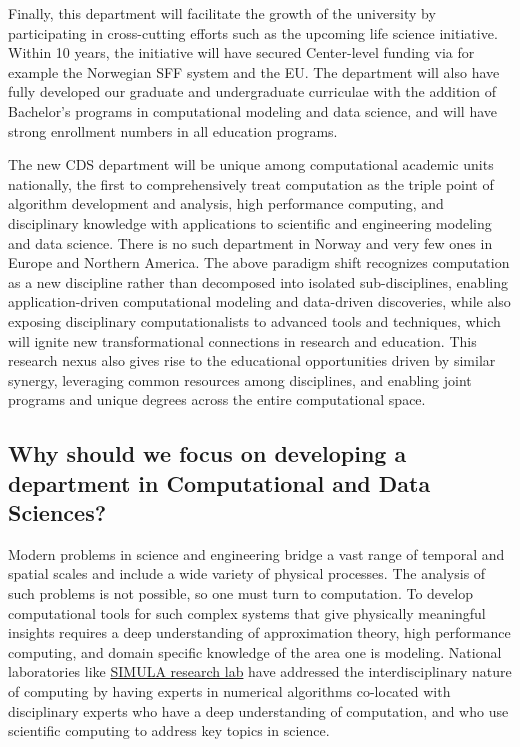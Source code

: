 \documentclass[%
oneside,                 %
final,                   %
10pt]{article}
\begin{document}
\noindent
Finally, this department will facilitate the growth of the
university by participating in cross-cutting efforts such as the
upcoming life science initiative. Within 10 years, the
initiative will have secured Center-level funding via for example the Norwegian SFF system and the EU.
The department will also have fully developed  our graduate and undergraduate curriculae
with the addition of Bachelor’s programs in computational modeling and
data science, and will have strong enrollment numbers in all education programs. 


The new CDS department  will be unique among computational academic units nationally, the first to comprehensively
treat computation as the triple point of algorithm development and analysis, high performance
computing, and disciplinary knowledge with applications to scientific and engineering modeling
and data science. There is no such department in Norway and very few ones in Europe and Northern America. 
The above paradigm shift recognizes computation as a new discipline rather
than decomposed into isolated sub-disciplines, enabling application-driven computational
modeling and data-driven discoveries, while also exposing disciplinary computationalists to advanced tools and
techniques, which will ignite new transformational connections in research and
education. This research nexus also gives rise to the educational opportunities driven by similar
synergy, leveraging common resources among disciplines, and enabling joint programs and
unique degrees across the entire computational space.



\subsection*{Why should we focus on developing a department in Computational and Data Sciences?}

Modern problems in science and engineering bridge a vast range of temporal and spatial scales
and include a wide variety of physical processes. The analysis of such problems is not possible, so
one must turn to computation. To develop computational tools for such complex systems that
give physically meaningful insights requires a deep understanding of approximation theory, high
performance computing, and domain specific knowledge of the area one is modeling. National laboratories like \href{{https://www.simula.no/}}{SIMULA research lab} have addressed the interdisciplinary nature of computing by having experts
in numerical algorithms co-located with disciplinary experts who have a deep understanding of
computation, and who use scientific computing to address key topics in science.
\end{document}
